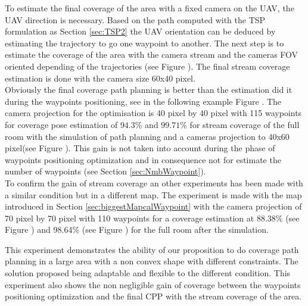 To estimate the final coverage of the area with a fixed camera on the UAV, the UAV direction is necessary. 
Based on the path computed with the TSP formulation as Section \ref{sec:TSP2} the UAV orientation can be deduced by estimating the trajectory to go one waypoint to another.
The next step is to estimate the coverage of the area with the camera stream and the cameras FOV oriented depending of the trajectories (see Figure ). The final stream coverage estimation is done with the camera size 60x40 pixel. \\
Obviously the final coverage path planning is better than the estimation did it during the waypoints positioning, see  in the following example Figure . The camera projection for the optimisation  is 40 pixel by 40 pixel with 115 waypoints for coverage pose estimation of $94.3\%$ and $99.71\%$ for stream coverage of the full room with the simulation of path planning and a cameras projection to 40x60 pixel(see Figure ). This gain is not taken into account during the phase of waypoints positioning optimization and in consequence not for estimate the number of waypoints (see Section \ref{sec:NmbWaypoint}).\\
To confirm the gain of stream coverage an other experiments has been made with a similar condition but in a different map. The experiment is made with the map introduced in Section \ref{sec:biggestMapcalWaypoint} with the camera projection of 70 pixel by 70 pixel with 110 waypoints for a coverage estimation at 88.38\%  (see Figure ) and 98.64\% (see Figure ) for the full room after the simulation.

This experiment demonstrates the ability of our proposition to do coverage path planning in a large area with a non convex shape with different constraints. The solution proposed being adaptable and flexible to the different condition. This experiment also shows the non negligible gain of coverage between the waypoints positioning optimization and the final CPP with the stream coverage of the area.




